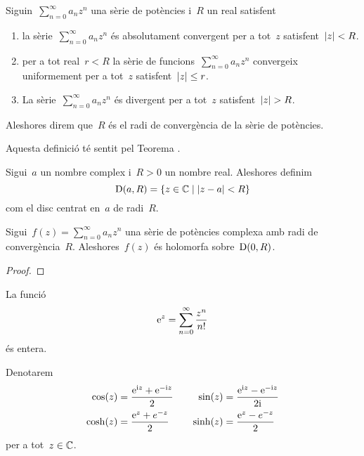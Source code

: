 \documentclass[../Apunts.tex]{subfiles}
\begin{document}
    \begin{definition}[Radi de convergència]
        Siguin~\(\sum_{n=0}^{\infty}a_{n}z^{n}\) una sèrie de potències i~\(R\)
        un real satisfent
        \begin{enumerate}
            \item la sèrie~\(\sum_{n=0}^{\infty}a_{n}z^{n}\) és absolutament
                convergent per a tot~\(z\) satisfent~\(\modul{z}<R\).
            \item per a tot real~\(r<R\) la sèrie de
                funcions~\(\sum_{n=0}^{\infty}a_{n}z^{n}\) convergeix
                uniformement per a tot~\(z\) satisfent~\(\modul{z}\leq r\).
            \item La sèrie~\(\sum_{n=0}^{\infty}a_{n}z^{n}\) és divergent
                per a tot~\(z\) satisfent~\(\modul{z}>R\).
        \end{enumerate}
        Aleshores direm que~\(R\) és el radi de convergència de la sèrie de
        potències.
        
        Aquesta definició té sentit pel Teorema
        .
    \end{definition}
    \begin{definition}[Disc]
        \label{def:disc}
        Sigui~\(a\) un nombre complex i~\(R>0\) un nombre real.
        Aleshores definim
        \[\Disc(a,R)=\{z\in\CC\mid\modul{z-a}<R\}\]
        com el disc centrat en~\(a\) de radi~\(R\).
    \end{definition}
    \begin{proposition}
        Sigui~\(f(z)=\sum_{n=0}^{\infty}a_{n}z^{n}\) una sèrie de potències
        complexa amb radi de convergència~\(R\).
        Aleshores~\(f(z)\) és holomorfa sobre~\(\operatorname{D}(0,R)\).
    \end{proposition}
    \begin{proof}
    \end{proof}
    \begin{example}
        \label{ex:exponencial complexa}
        La funció
        \[\mathrm{e}^{z}=\sum_{n=0}^{\infty}\frac{z^{n}}{n!}\]
        és entera.
    \end{example}
    \begin{notation}
        Denotarem
        \begin{gather*}
            \begin{split}
                \cos(z)&=\frac{\mathrm{e}^{\mathrm{i} z}+\mathrm{e}^{-\mathrm{i} z}}{2} \\
                \cosh(z)&=\frac{\mathrm{e}^{z}+e^{-z}}{2}
            \end{split}\qquad
            \begin{split}
                \sin(z)&=\frac{\mathrm{e}^{\mathrm{i} z}-\mathrm{e}^{-\mathrm{i} z}}{2\mathrm{i}} \\
                \sinh(z)&=\frac{\mathrm{e}^{z}-e^{-z}}{2}
            \end{split} \\
        \end{gather*}
        per a tot~\(z\in\mathbb{C}\).
    \end{notation}
\end{document}
